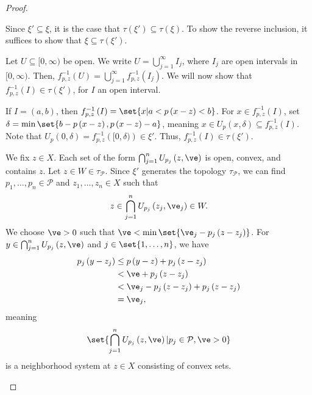 \documentclass[10pt]{mypackage}
\begin{document}
\begin{proof}
\begin{enumerate}[(1)]
      Since $\xi' \subseteq \xi$, it is the case that $\tau\left(\xi'\right) \subseteq \tau\left(\xi\right)$. To show the reverse inclusion, it suffices to show that $\xi\subseteq \tau\left(\xi'\right)$.\newline

      Let $U\subseteq [0,\infty)$ be open. We write $U = \bigcup_{j=1}^{\infty}I_{j}$, where $I_j$ are open intervals in $[0,\infty)$. Then, $f_{p,z}^{-1}\left(U\right) = \bigcup_{j=1}^{\infty} f_{p,z}^{-1}\left(I_j\right)$. We will now show that $f_{p,z}^{-1}\left(I\right)\in \tau\left(\xi'\right)$, for $I$ an open interval.\newline

      If $I = \left(a,b\right)$, then $f_{p,z}^{-1}\left(I\right) = \set{x| a < p\left(x-z\right) < b}$. For $x\in f_{p,z}^{-1}\left(I\right)$, set $\delta = \min\set{b-p\left(x-z\right),p\left(x-z\right)-a}$, meaning $x\in U_{p}\left(x,\delta\right)\subseteq f_{p,z}^{-1}\left(I\right)$. Note that $U_{p}\left(0,\delta\right) = f_{p,z}^{-1}\left([0,\delta)\right)\in \xi'$. Thus, $f_{p,z}^{-1}\left(I\right)\in \tau\left(\xi'\right)$.\newline

      We fix $z\in X$. Each set of the form $\bigcap_{j=1}^{n}U_{p_j}\left(z,\ve\right)$ is open, convex, and contains $z$. Let $z \in W\in \tau_{\mathcal{P}}$. Since $\xi'$ generates the topology $\tau_{\mathcal{P}}$, we can find $p_1,\dots,p_n\in \mathcal{P}$ and $z_1,\dots,z_n\in X$ such that
      \begin{align*}
        z\in \bigcap_{j=1}^{n}U_{p_j}\left(z_j,\ve_j\right)\in W.
      \end{align*}
      We choose $\ve > 0$ such that $\ve < \min\set{\ve_j - p_j\left(z-z_j\right)}$. For $y\in \bigcap_{j=1}^{n}U_{p_j}\left(z,\ve\right)$ and $j\in \set{1,\dots,n}$, we have
      \begin{align*}
        p_{j}\left(y-z_j\right) &\leq p\left(y-z\right) + p_j\left(z-z_j\right)\\
                                &< \ve + p_j\left(z-z_j\right)\\
                                &< \ve_j - p_j\left(z-z_j\right) + p_j\left(z-z_j\right)\\
                                &= \ve_j,
      \end{align*}
      meaning
      \begin{align*}
        \set{\bigcap_{j=1}^{n}U_{p_j}\left(z,\ve\right)| p_j\in \mathcal{P},\ve > 0}
      \end{align*}
      is a neighborhood system at $z\in X$ consisting of convex sets.
  \end{enumerate}
\end{proof}
\end{document}
